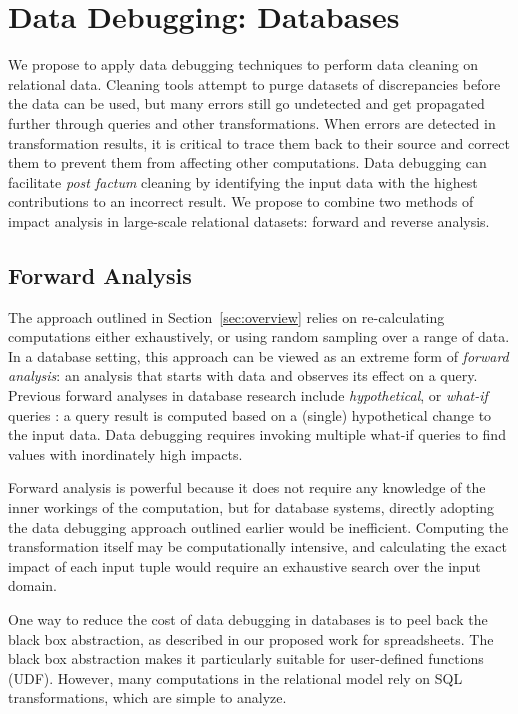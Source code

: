 \section{Data Debugging: Databases} %
\label{sec:bi_directional}

We propose to apply data debugging techniques to perform data cleaning
on relational data.  Cleaning tools attempt to purge datasets of
discrepancies before the data can be used, but many errors still go
undetected and get propagated further through queries and other
transformations. When errors are detected in transformation results,
it is critical to trace them back to their source and correct them to
prevent them from affecting other computations. Data debugging can
facilitate \emph{post factum} cleaning by identifying the input data
with the highest contributions to an incorrect result. We propose to
combine two methods of impact analysis in large-scale relational
datasets: forward and reverse analysis.

\subsection{Forward Analysis} %
\label{sub:forward_analysis}

The approach outlined in Section~\ref{sec:overview} relies on
re-calculating computations either exhaustively, or using random
sampling over a range of data. In a database setting, this approach
can be viewed as an extreme form of \emph{forward analysis}: an
analysis that starts with data and observes its effect on a
query. Previous forward analyses in database research include
\emph{hypothetical}, or \emph{what-if} queries
\cite{DBLP:conf/vldb/BalminPP00,DBLP:conf/icde/LakshmananRS08}: a
query result is computed based on a (single) hypothetical change to
the input data. Data debugging requires invoking multiple what-if
queries to find values with inordinately high impacts.

Forward analysis is powerful because it does not require any knowledge
of the inner workings of the computation, but for database systems,
directly adopting the data debugging approach outlined earlier would
be inefficient. Computing the transformation itself may be
computationally intensive, and calculating the exact impact of each
input tuple would require an exhaustive search over the input domain.

One way to reduce the cost of data debugging in databases is to peel
back the black box abstraction, as described in our proposed work for
spreadsheets.  The black box abstraction makes it particularly
suitable for user-defined functions (UDF). However, many computations
in the relational model rely on SQL transformations, which are simple
to analyze.

